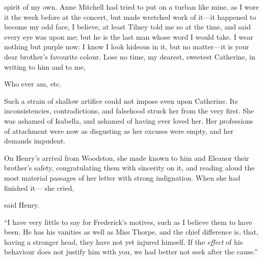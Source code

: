 spirit of my own. Anne Mitchell had tried to put on a turban like mine, as I wore it the week before at the concert, but made wretched work of it---it happened to become my odd face, I believe, at least Tilney told me so at the time, and said every eye was upon me; but he is the last man whose word I would take. I wear nothing but purple now: I know I look hideous in it, but no matter---it is your dear brother's favourite colour. Lose no time, my dearest, sweetest Catherine, in writing to him and to me,

Who ever am, etc.

Such a strain of shallow artifice could not impose even upon Catherine. Its inconsistencies, contradictions, and falsehood struck her from the very first. She was ashamed of Isabella, and ashamed of having ever loved her. Her professions of attachment were now as disgusting as her excuses were empty, and her demands impudent. 

On Henry's arrival from Woodston, she made known to him and Eleanor their brother's safety, congratulating them with sincerity on it, and reading aloud the most material passages of her letter with strong indignation. When she had finished it--- she cried, 

 said Henry.


“I have very little to say for Frederick's motives, such as I believe them to have been. He has his vanities as well as Miss Thorpe, and the chief difference is, that, having a stronger head, they have not yet injured himself. If the {\em effect} of his behaviour does not justify him with you, we had better not seek after the cause.”


